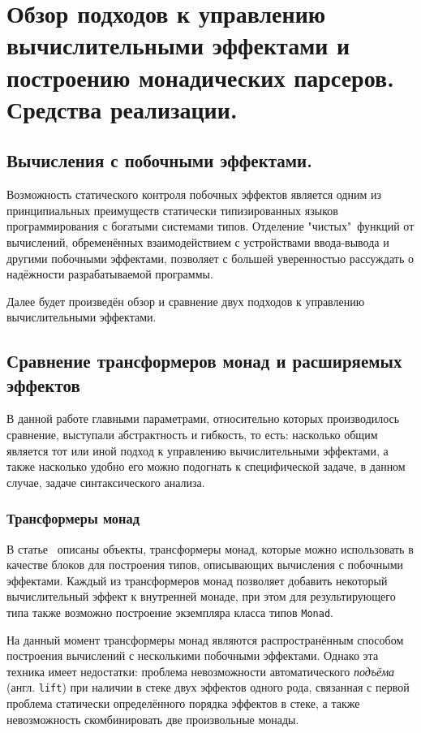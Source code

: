 \chapter{Обзор подходов к управлению вычислительными эффектами и построению
монадических парсеров. Средства реализации.}

\section{Вычисления с побочными эффектами. }

  Возможность статического контроля побочных эффектов является одним из принципиальных 
  преимуществ статически типизированных языков программирования с богатыми системами типов. 
  Отделение "чистых"~функций от вычислений, обременённых взаимодействием с 
  устройствами ввода-вывода и другими побочными эффектами, позволяет с большей
  уверенностью рассуждать о надёжности разрабатываемой программы. 

  Далее будет произведён обзор и сравнение двух подходов к управлению вычислительными 
  эффектами.   

\section{Сравнение трансформеров монад и расширяемых эффектов}

  В данной работе главными параметрами, относительно которых производилось сравнение, 
  выступали абстрактность и гибкость, то есть: насколько общим является тот или иной подход к управлению вычислительными эффектами, а также насколько удобно его можно подогнать к 
  специфической задаче, в данном случае, задаче синтаксического анализа.  

  \subsection{Трансформеры монад}

    В статье~\cite{monadTransformers} описаны объекты, трансформеры монад,
    которые можно использовать в качестве блоков для построения типов, описывающих
    вычисления с побочными эффектами. Каждый из трансформеров монад позволяет
    добавить некоторый вычислительный эффект к внутренней монаде, при
    этом для результирующего типа также возможно построение экземпляра класса
    типов \lstinline{Monad}.

    На данный момент трансформеры монад являются распространённым способом
    построения вычислений с несколькими побочными эффектами. Однако эта
    техника имеет недостатки: проблема невозможности автоматического
    \emph{подъёма} (англ. \lstinline{lift}) при наличии в стеке двух эффектов одного
    рода, связанная с первой проблема статически определённого порядка эффектов в
    стеке, а также невозможность скомбинировать две произвольные монады.

